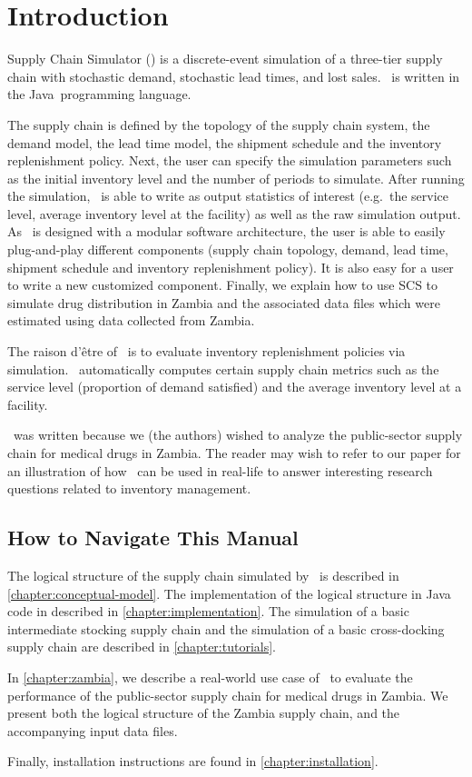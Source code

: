 \chapter{Introduction}

Supply Chain Simulator (\scs)
is a discrete-event simulation of a three-tier supply chain
with stochastic demand, stochastic lead times, and lost sales.
\scs\ is written in the Java\texttrademark\ programming language.

The supply chain is defined by the topology of the supply chain system,
the demand model, the lead time model,
the shipment schedule
and the inventory replenishment policy.
Next, the user can specify the simulation parameters
such as the initial inventory level
and the number of periods to simulate.
After running the simulation,
\scs\ is able to write as output
statistics of interest
(e.g.\ the service level, average inventory level at the facility)
as well as the raw simulation output.
As \scs\ is designed with a modular software architecture,
the user is able to easily plug-and-play different components
(supply chain topology, demand, lead time, shipment schedule
and inventory replenishment policy).
It is also easy for a user to write a new customized component.
Finally, we explain how to use SCS
to simulate drug distribution in Zambia
and the associated data files which were estimated
using data collected from Zambia.

The raison d'\^{etre} of \scs\
is to evaluate inventory replenishment policies via simulation.
\scs\ automatically computes certain supply chain metrics
such as the service level (proportion of demand satisfied)
and the average inventory level at a facility.

\scs\ was written because we (the authors) wished to analyze
the public-sector supply chain for medical drugs in Zambia.
The reader may wish to refer to our paper
for an illustration of how \scs\
can be used in real-life to answer interesting research questions
related to inventory management.





\section{How to Navigate This Manual}

The logical structure of the supply chain simulated by \scs\
is described in \autoref{chapter:conceptual-model}.
The implementation of the logical structure in Java code
in described in \autoref{chapter:implementation}.
The simulation of a basic intermediate stocking supply chain
and the simulation of a basic cross-docking supply chain
are described in \autoref{chapter:tutorials}.

In \autoref{chapter:zambia},
we describe a real-world use case of \scs\
to evaluate the performance
of the public-sector supply chain for medical drugs in Zambia.
We present both the logical structure of the Zambia supply chain,
and the accompanying input data files.

Finally, installation instructions are found in
\autoref{chapter:installation}.


